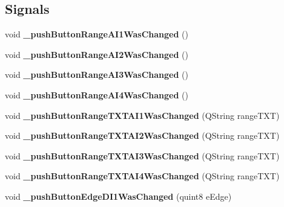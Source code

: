 \subsection*{Signals}
\begin{DoxyCompactItemize}
\item 
\mbox{\label{class_trigger_window_a3a5ea5831cadd88f3b3120b89962aa9e}} 
void {\bfseries \+\_\+push\+Button\+Range\+A\+I1\+Was\+Changed} ()
\item 
\mbox{\label{class_trigger_window_a3cdde0f0cfe884765e2f6851c63bb23e}} 
void {\bfseries \+\_\+push\+Button\+Range\+A\+I2\+Was\+Changed} ()
\item 
\mbox{\label{class_trigger_window_a448f1c7c747c59faafa3387a880c1a16}} 
void {\bfseries \+\_\+push\+Button\+Range\+A\+I3\+Was\+Changed} ()
\item 
\mbox{\label{class_trigger_window_a37e137dfb731d57cbc2445eb0a63df20}} 
void {\bfseries \+\_\+push\+Button\+Range\+A\+I4\+Was\+Changed} ()
\item 
\mbox{\label{class_trigger_window_a3687ba75022a9835523fbebb3d275975}} 
void {\bfseries \+\_\+push\+Button\+Range\+T\+X\+T\+A\+I1\+Was\+Changed} (Q\+String range\+T\+XT)
\item 
\mbox{\label{class_trigger_window_a0d0c7a8a42ab48d4d7d1a99c6267c531}} 
void {\bfseries \+\_\+push\+Button\+Range\+T\+X\+T\+A\+I2\+Was\+Changed} (Q\+String range\+T\+XT)
\item 
\mbox{\label{class_trigger_window_aa13f86b6613a54fb91b952d078ca53ef}} 
void {\bfseries \+\_\+push\+Button\+Range\+T\+X\+T\+A\+I3\+Was\+Changed} (Q\+String range\+T\+XT)
\item 
\mbox{\label{class_trigger_window_ae349244ab4aae7a00e79d81db913c2e1}} 
void {\bfseries \+\_\+push\+Button\+Range\+T\+X\+T\+A\+I4\+Was\+Changed} (Q\+String range\+T\+XT)
\item 
\mbox{\label{class_trigger_window_a4d019f69958774f6792a853618303b2b}} 
void {\bfseries \+\_\+push\+Button\+Edge\+D\+I1\+Was\+Changed} (quint8 e\+Edge)

\end{DoxyCompactItemize}
